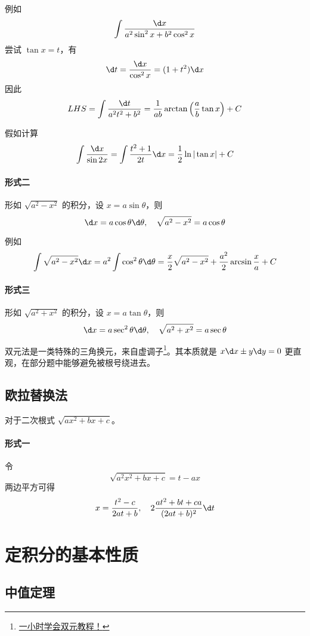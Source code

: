 例如
\[ \int \frac{\d x}{a^2 \sin^2 x + b^2 \cos^2 x} \]
尝试 $\tan x = t$，有
\[ \d t = \frac{\d x}{\cos^2 x} = (1 + t^2) \d x \]
因此
\[ LHS = \int \frac{\d t}{a^2 t^2 + b^2} = \frac{1}{ab} \arctan \left( \frac{a}{b} \tan x \right) + C \]


假如计算
\[ \int \frac{\d x}{\sin 2x} = \int \frac{t^2+1}{2t} \d x = \frac{1}{2} \ln | \tan x| + C \]


\paragraph{形式二} 形如 $\sqrt{a^2 - x^2}$ 的积分，设 $x = a \sin \theta$，则
\[ \d x = a \cos \theta \d \theta, \quad \sqrt{a^2 - x^2} = a \cos \theta \]

例如
\[ \int \sqrt{a^2 - x^2} \d x = a^2 \int \cos^2 \theta \d \theta = \frac{x}{2}\sqrt{a^2 - x^2} + \frac{a^2}{2} \arcsin \frac{x}{a} + C \]

\paragraph{形式三} 形如 $\sqrt{a^2 + x^2}$ 的积分，设 $x = a \tan \theta$，则
\[ \d x = a \sec^2 \theta \d \theta, \quad \sqrt{a^2+x^2} = a \sec \theta \]

双元法是一类特殊的三角换元，来自虚调子\footnote{\href{https://zhuanlan.zhihu.com/p/443599480}{一小时学会双元教程！}}。其本质就是 $x\d x \pm y \d y = 0$ 更直观，在部分题中能够避免被根号绕进去。

\subsection{欧拉替换法}

对于二次根式 $\sqrt{a x^2 + b x + c}$。

\paragraph{形式一} 令
\[ \sqrt{a^2x^2+bx+c} = t - ax \]
两边平方可得
\[ x = \frac{t^2 - c}{2at + b}, \quad 2\frac{at^2 + bt + ca}{(2at+b)^2} \d t \]

\section{定积分的基本性质}

\subsection{中值定理}

